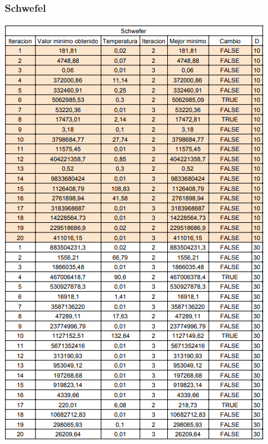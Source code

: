 \documentclass[10pt]{article}
\begin{document}
\subsubsection{Schwefel}
\begin{center}
  \includegraphics[scale=0.5]{imgs/schwefer.png}
\end{center}
\end{document}
